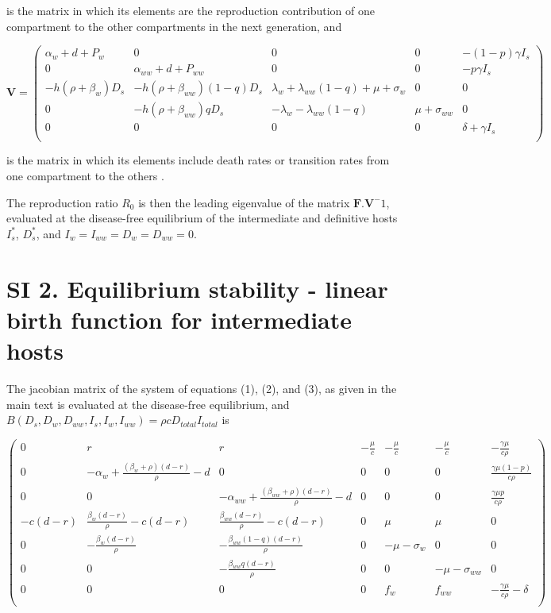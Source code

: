 \documentclass[11pt]{article}
\begin{document}
is the matrix in which its elements are the reproduction contribution of one compartment to the other compartments in the next generation, and

\[
\mathbf{V} = 
\begin{pmatrix}
\alpha_w + d + P_w  & 0 & 0 & 0 & - (1 - p) \gamma  I_s\\
 0 & \alpha_{ww} + d + P_{ww} & 0 & 0 & - p \gamma I_s \\
- h(\rho + \beta_w) D_s & - h(\rho + \beta_{ww})  (1 - q) D_s & \lambda_w +  \lambda_{ww} (1-q) + \mu + \sigma_w & 0 & 0 \\
 0 & -h (\rho + \beta_{ww}) q D_s  & -\lambda_w -  \lambda_{ww} (1 - q) & \mu + \sigma_{ww} & 0 \\
 0 & 0 & 0 & 0 & \delta + \gamma I_s \\
\end{pmatrix}
\]

is the matrix in which its elements include death rates or transition rates from one compartment to the others \citep{Diekmann1990, Diekmann2009, hurford:JRSI:2010}. 

The reproduction ratio $R_0$ is then the leading eigenvalue of the matrix $\mathbf{F}.\mathbf{V}^-1$, evaluated at the disease-free equilibrium of the intermediate and definitive hosts $I_s^*$, $D_s^*$, and $I_w = I_{ww} = D_w = D_{ww} = 0$.

\section*{SI 2. Equilibrium stability - linear birth function for intermediate hosts}

The jacobian matrix of the system of equations (1), (2), and (3), as given in the main text  is evaluated at the disease-free equilibrium, and $B(D_s, D_w, D_{ww}, I_s, I_w, I_{ww}) = \rho c D_{total} I_{total}$ is

\[
\begin{pmatrix}
	0 & r & r & -\frac{\mu}{c} & -\frac{\mu }{c} & -\frac{\mu }{c} & -\frac{\gamma  \mu }{c \rho } \\
	0 & -\alpha_w + \frac{(\beta_w + \rho ) (d-r)}{\rho } - d & 0 & 0 & 0 & 0 & \frac{\gamma  \mu  (1-p)}{c \rho } \\
	0 & 0 & -\alpha_{ww} + \frac{(\beta_{ww} + \rho ) (d-r)}{\rho } - d & 0 & 0 & 0 & \frac{\gamma  \mu  p}{c \rho } \\
	-c (d-r) & \frac{\beta_w (d-r)}{\rho } - c (d-r) & \frac{\beta_{ww} (d-r)}{\rho }-c (d-r) & 0 & \mu  & \mu  & 0 \\
	0 & -\frac{\beta_w (d-r)}{\rho } & -\frac{ \beta_{ww} (1-q) (d-r)}{\rho } & 0 & -\mu - \sigma_w & 0 & 0 \\
	0 & 0 & -\frac{\beta_{ww} q (d-r)}{\rho } & 0 & 0 & -\mu - \sigma_{ww} & 0 \\
	0 & 0 & 0 & 0 & f_w & f_{ww} & -\frac{\gamma  \mu }{c \rho } - \delta  \\
\end{pmatrix}
\]
\end{document}
